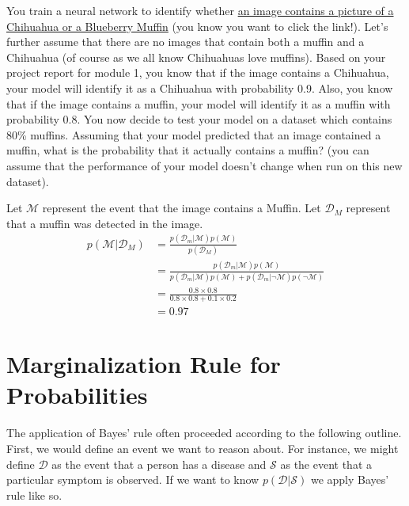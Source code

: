 \documentclass[assignment01_Solutions]{subfiles}
\begin{document}
\begin{exercise}[(20 minutes)]
\item You train a neural network to identify whether \href{https://www.freecodecamp.org/news/chihuahua-or-muffin-my-search-for-the-best-computer-vision-api-cbda4d6b425d/}{an image contains a picture of a Chihuahua or a Blueberry Muffin} (you know you want to click the link!).  Let's further assume that there are no images that contain both a muffin and a Chihuahua (of course as we all know Chihuahuas love muffins).  Based on your project report for module 1, you know that if the image contains a Chihuahua, your model will identify it as a Chihuahua with probability 0.9.  Also, you know that if the image contains a muffin, your model will identify it as a muffin with probability 0.8.  You now decide to test your model on a dataset which contains 80\% muffins.  Assuming that your model predicted that an image contained a muffin, what is the probability that it actually contains a muffin? (you can assume that the performance of your model doesn't change when run on this new dataset).

\begin{boxedsolution}
Let $\mathcal{M}$ represent the event that the image contains a Muffin.  Let $\mathcal{D}_M$ represent that a muffin was detected in the image.
\begin{align}
p(\mathcal{M} | \mathcal{D}_M) &= \frac{p(\mathcal{D}_m | \mathcal{M})  p(\mathcal{M})}{p(\mathcal{D}_M)} \\
&= \frac{p(\mathcal{D}_m | \mathcal{M})  p(\mathcal{M})}{ p(\mathcal{D}_m | \mathcal{M})  p(\mathcal{M}) + p(\mathcal{D}_m | \neg \mathcal{M})  p(\neg \mathcal{M})} \\
&= \frac{0.8 \times 0.8}{0.8 \times 0.8 + 0.1 \times 0.2} \\
&= 0.97
\end{align}
\end{boxedsolution}
\ees
\end{exercise}

\section{Marginalization Rule for Probabilities}
The application of Bayes' rule often proceeded according to the following outline.  First, we would define an event we want to reason about. For instance, we might define $\mathcal{D}$ as the event that a person has a disease and $\mathcal{S}$ as the event that a particular symptom is observed.  If we want to know $p(\mathcal{D} | \mathcal{S})$ we apply Bayes' rule like so.
\end{document}
